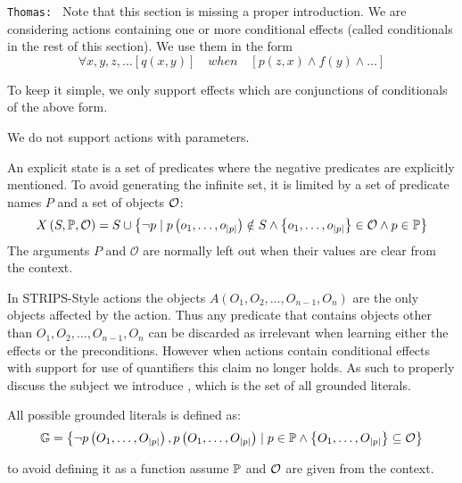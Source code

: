 \documentclass[\master/Master.tex]{subfiles}
\begin{document}
\texttt{Thomas: } Note that this section is missing a proper introduction. We are considering actions containing one or more conditional effects (called conditionals in the rest of this section). We use them in the form 
\begin{equation*}
    \forall x, y, z, \dots \left[ q(x, y) \right] \quad when \quad 
        \left[ p(z, x) \land f(y) \land \dots \right]
\end{equation*}

To keep it simple, we only support effects which are conjunctions of conditionals of the above form.

We do not support actions with parameters.


\begin{definition}
	An explicit state is a set of predicates where the negative predicates are explicitly mentioned. To avoid generating the infinite set, it is limited by a set of predicate names $P$ and a set of objects $\mathcal{O}$:
	\begin{equation*}
		X\left(S, \mathbb{P}, \mathcal{O}\right) = S \cup
		\left\{ \neg p \mid 
		p\left(o_1, \dots, o_{|p|}\right) \notin S \land 
		\left\{o_1, \dots, o_{|p|} \right\} \in \mathcal{O} \land
		p \in \mathbb{P}
		\right\}
	\end{equation*}
	The arguments $P$ and $\mathcal{O}$ are normally left out when their values are clear from the context.
\end{definition}


In STRIPS-Style actions the objects $A(O_1,O_2,\ldots,O_{n-1},O_n)$ are the only objects affected by the action.
Thus any predicate that contains objects other than $O_1,O_2,\ldots,O_{n-1},O_n$ can be discarded as irrelevant when learning either the effects or the preconditions.
However when actions contain conditional effects with support for use of quantifiers this claim no longer holds.
As such to properly discuss the subject we introduce \glits, which is the set of all grounded literals.
\begin{definition}
	All possible grounded literals \glits is defined as:
	\begin{equation*}
		\mathbb{G} =
		\left\{ \neg p\left(O_1, \dots, O_{|p|}\right), 
				p\left(O_1, \dots, O_{|p|}\right) 
				\mid 
		p \in \mathbb{P} \land 
		\left\{O_1, \dots, O_{|p|} \right\} \subseteq \mathcal{O}
		\right\}
	\end{equation*}
	
	to avoid defining it as a function assume $\mathbb{P}$ and $\mathcal{O}$ are given from the context.
\end{definition}
\end{document}
